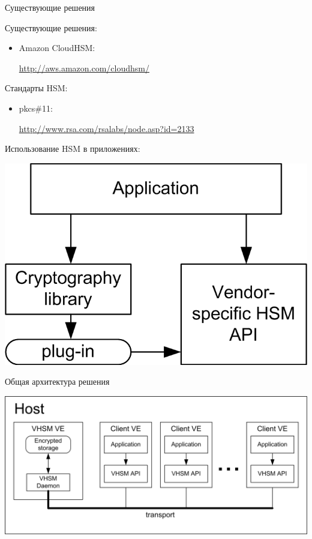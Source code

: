 \documentclass[utf8, 11pt]{beamer}
\begin{document}
\begin{frame}{Существующие решения}

Существующие решения:
\begin{itemize}
\item Amazon CloudHSM:

\url{http://aws.amazon.com/cloudhsm/}
\end{itemize}

\vspace*{\fill}

Стандарты HSM:
\begin{itemize}
\item pkcs\#11:

\url{http://www.rsa.com/rsalabs/node.asp?id=2133}
\end{itemize}

\vspace*{\fill}

Использование HSM в приложениях:
\begin{center}
\includegraphics[scale=0.75]{img1-2}
\end{center}

\end{frame}

\begin{frame}{Общая архитектура решения}
\begin{center}
\includegraphics[width=0.95\paperwidth]{img2}
\end{center}
\end{frame}
\end{document}
